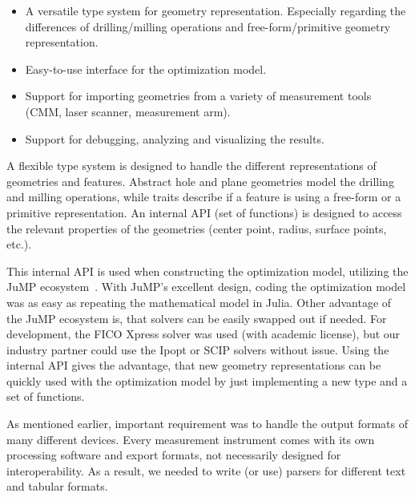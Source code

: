\documentclass{juliacon}
\begin{document}
\begin{itemize}
	\item A versatile type system for geometry representation. Especially regarding the differences of drilling/milling operations and free-form/primitive geometry representation.
	\item Easy-to-use interface for the optimization model.
	\item Support for importing geometries from a variety of measurement tools (CMM, laser scanner, measurement arm).
	\item Support for debugging, analyzing and visualizing the results.
\end{itemize}

A flexible type system is designed to handle the different representations of geometries and features.
Abstract hole and plane geometries model the drilling and milling operations, while traits describe if a feature is using a free-form or a primitive representation.
An internal API (set of functions) is designed to access the relevant properties of the geometries (center point, radius, surface points, etc.).

This internal API is used when constructing the optimization model, utilizing the JuMP ecosystem~\cite{Lubin2023}.
With JuMP's excellent design, coding the optimization model was as easy as repeating the mathematical model in Julia.
Other advantage of the JuMP ecosystem is, that solvers can be easily swapped out if needed.
For development, the FICO Xpress solver was used (with academic license), but our industry partner could use the Ipopt or SCIP solvers without issue.
Using the internal API gives the advantage, that new geometry representations can be quickly used with the optimization model by just implementing a new type and a set of functions.

As mentioned earlier, important requirement was to handle the output formats of many different devices.
Every measurement instrument comes with its own processing software and export formats, not necessarily designed for interoperability.
As a result, we needed to write (or use) parsers for different text and tabular formats.
\end{document}
